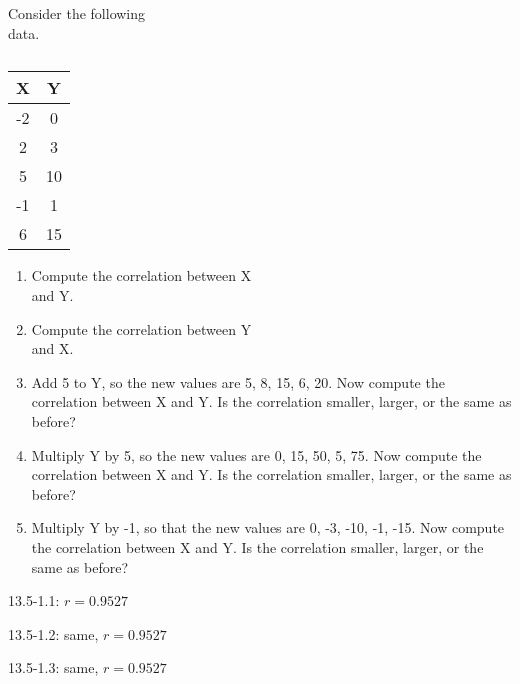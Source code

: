 \documentclass[11pt]{book}\usepackage[]{graphicx}\usepackage[]{color}
\begin{document}
\twocolumn

\section{}

\begin{exercises}
\begin{exercise}  %

Consider the following \\ data.
	\begin{table}[ht] 
		\caption{}
		\begin{center}
		\begin{tabular}{c c}
		\textbf{X} & \textbf{Y}\\ \hline
		-2 & 0\\
		2 & 3\\
		5 & 10\\
		-1 & 1\\
		6 & 15\\ \hline
		\end{tabular}
		\end{center}
	\end{table}
	\begin{enumerate}
		\item Compute the correlation between X  \\ and Y.
		\item Compute the correlation between Y  \\ and X.
		\item Add 5 to Y, so the new values are 5, 8, 15, 6, 20. Now compute the correlation between X and Y. Is the correlation smaller, larger, or the same as before?
		\item Multiply Y by 5, so the new values are 0, 15, 50, 5, 75. Now compute the correlation between X and Y. Is the correlation smaller, larger, or the same as before?
		\item Multiply Y by -1, so that the new values are 0, -3, -10, -1, -15. Now compute the correlation between X and Y. Is the correlation smaller, larger, or the same as before?
	\end{enumerate}
\end{exercise}
\begin{solution}  %



13.5-1.1: $r = 0.9527 $ 

13.5-1.2: same, $r = 0.9527 $ 

13.5-1.3: same, $r = 0.9527 $ 


\end{solution}
\end{exercises}
\end{document}
